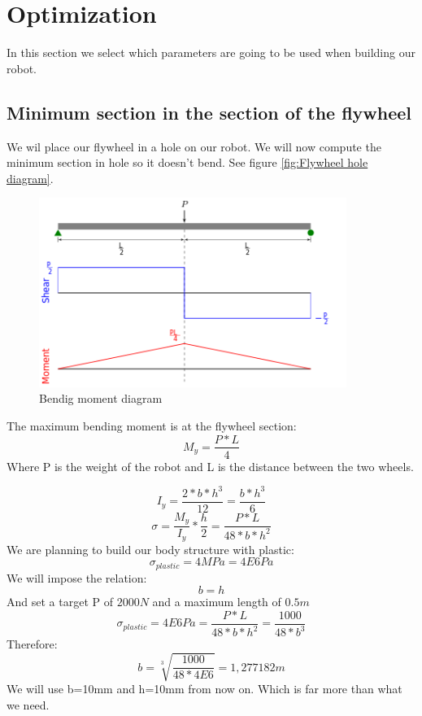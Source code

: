 \section{Optimization}
In this section we select which parameters are going to be used when building our robot.

\subsection{Minimum section in the section of the flywheel}
We wil place our flywheel in a hole on our robot. We will now compute the minimum section in hole so it doesn't bend. See figure \ref{fig:Flywheel hole diagram}.

\begin{figure}[ht]
	\centering
	\includegraphics[width=10cm]{img/Shear_Moment_Diagram.png}
	\caption{Bendig moment diagram}
	\label{fig:Bendig moment diagram}
\end{figure}
The maximum bending moment is at the flywheel section:
\[M_y = \frac{P * L}{4}\]
Where P is the weight of the robot and L is the distance between the two wheels.

\[I_y = \frac{2*b*h^3}{12}=\frac{b*h^3}{6}\]
\[\sigma=\frac{M_y}{I_y}*\frac{h}{2} = \frac{P*L}{48*b*h^2}\]
We are planning to build our body structure with plastic:
\[\sigma_{plastic} = 4MPa = 4E6Pa\]
We will impose the relation:
\[b = h\]
And set a target P of $2000N$ and a maximum length of $0.5m$
\[\sigma_{plastic} = 4E6Pa = \frac{P*L}{48*b*h^2} = \frac{1000}{48*b^3} \]
Therefore:
\[b = \sqrt[3]{\frac{1000}{48*4E6}} = 1,277182 m\]
We will use b=10mm and h=10mm from now on. Which is far more than what we need.


